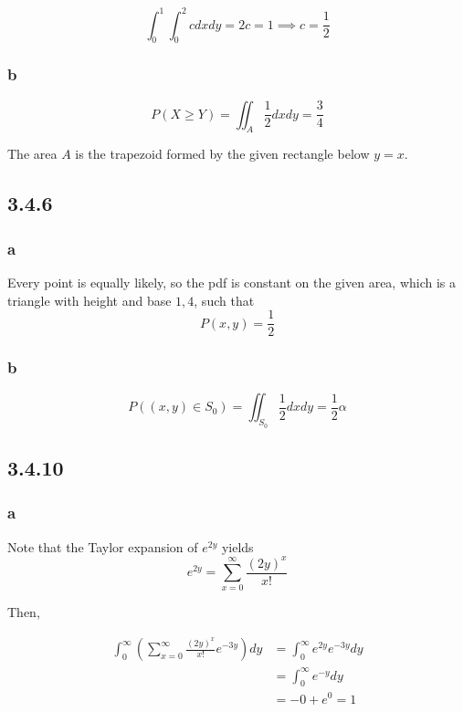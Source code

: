 \documentclass[12pt,letterpaper]{article}
\theoremstyle{definition}
\begin{document}
\[
  \int_0^1\int_0^2cdxdy = 2c = 1 \implies c = \frac{1}{2}
\]

\subsubsection*{b}

\[
  P(X \geq Y) = \iint_{A}\frac{1}{2}dxdy = \frac{3}{4}
\]

The area $A$ is the trapezoid formed by the given rectangle below $y = x$.

\subsection*{3.4.6}

\subsubsection*{a}

Every point is equally likely, so the pdf is constant on the given area, which
is a triangle with height and base $1, 4$, such that
\[
  P(x, y) = \frac{1}{2}
\]

\subsubsection*{b}

\[
  P((x,y) \in S_0) = \iint_{S_0}\frac{1}{2}dxdy = \frac{1}{2}\alpha
\]

\subsection*{3.4.10}

\subsubsection*{a}

Note that the Taylor expansion of $e^{2y}$ yields
\[
  e^{2y} = \sum_{x=0}^\infty\frac{(2y)^x}{x!}
\]

Then,

\begin{align*}
  \int_{0}^\infty(\sum_{x=0}^\infty \frac{(2y)^x}{x!}e^{-3y})dy &= \int_0^\infty e^{2y}e^{-3y}dy \\
                                                                &= \int_0^\infty e^{-y}dy \\
                                                                &= -0  + e^0 = 1
\end{align*}
\end{document}

